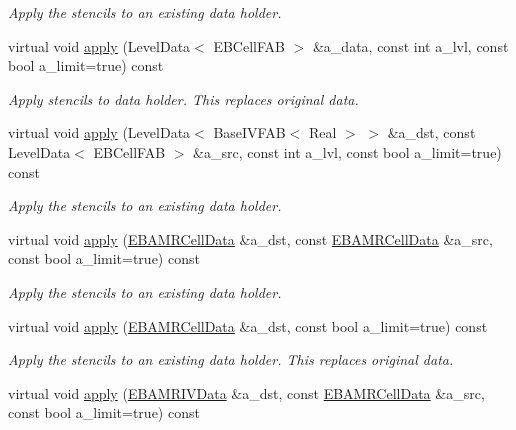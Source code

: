 \begin{DoxyCompactItemize}
\begin{DoxyCompactList}\small\item\em Apply the stencils to an existing data holder. \end{DoxyCompactList}\item 
virtual void \hyperlink{classirreg__amr__stencil_a4a462910684a1de5358fc0ab46e3a271}{apply} (Level\+Data$<$ E\+B\+Cell\+F\+AB $>$ \&a\+\_\+data, const int a\+\_\+lvl, const bool a\+\_\+limit=true) const 
\begin{DoxyCompactList}\small\item\em Apply stencils to data holder. This replaces original data. \end{DoxyCompactList}\item 
virtual void \hyperlink{classirreg__amr__stencil_a960337e57360ec7c943b234e1fa53973}{apply} (Level\+Data$<$ Base\+I\+V\+F\+AB$<$ Real $>$ $>$ \&a\+\_\+dst, const Level\+Data$<$ E\+B\+Cell\+F\+AB $>$ \&a\+\_\+src, const int a\+\_\+lvl, const bool a\+\_\+limit=true) const 
\begin{DoxyCompactList}\small\item\em Apply the stencils to an existing data holder. \end{DoxyCompactList}\item 
virtual void \hyperlink{classirreg__amr__stencil_a0d05c13f31550d15972b08cb527e13eb}{apply} (\hyperlink{type__definitions_8H_a7e610f301989e5e07781c5e338bdb7c3}{E\+B\+A\+M\+R\+Cell\+Data} \&a\+\_\+dst, const \hyperlink{type__definitions_8H_a7e610f301989e5e07781c5e338bdb7c3}{E\+B\+A\+M\+R\+Cell\+Data} \&a\+\_\+src, const bool a\+\_\+limit=true) const 
\begin{DoxyCompactList}\small\item\em Apply the stencils to an existing data holder. \end{DoxyCompactList}\item 
virtual void \hyperlink{classirreg__amr__stencil_a7e491011f64a1803cacd3cfd31abc199}{apply} (\hyperlink{type__definitions_8H_a7e610f301989e5e07781c5e338bdb7c3}{E\+B\+A\+M\+R\+Cell\+Data} \&a\+\_\+dst, const bool a\+\_\+limit=true) const 
\begin{DoxyCompactList}\small\item\em Apply the stencils to an existing data holder. This replaces original data. \end{DoxyCompactList}\item 
virtual void \hyperlink{classirreg__amr__stencil_a5d038b4f4421d193459ab22e0f8e227c}{apply} (\hyperlink{type__definitions_8H_a6b8fa905d55cbb491b52180386f0e0c1}{E\+B\+A\+M\+R\+I\+V\+Data} \&a\+\_\+dst, const \hyperlink{type__definitions_8H_a7e610f301989e5e07781c5e338bdb7c3}{E\+B\+A\+M\+R\+Cell\+Data} \&a\+\_\+src, const bool a\+\_\+limit=true) const 

\end{DoxyCompactItemize}
